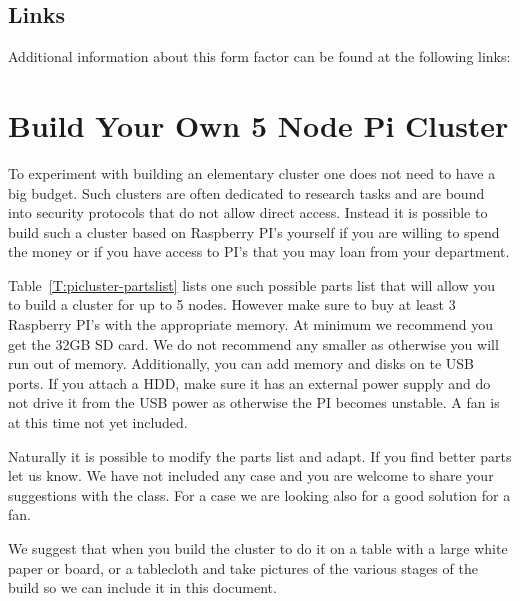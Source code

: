 \subsection{Links}\label{links}

Additional information about this form factor can be found at the
following links:




\section{Build Your Own 5 Node Pi Cluster}\label{s:pi5}

To experiment with building an elementary cluster one does not need to
have a big budget. Such clusters are often dedicated to research tasks
and are bound into security protocols that do not allow direct
access. Instead it is possible to build such a cluster based on
Raspberry PI's yourself if you are willing to spend the money or if
you have access to PI's that you may loan from your department.

Table~\ref{T:picluster-partslist} lists one such possible parts list
that will allow you to build a cluster for up to 5 nodes. However make
sure to buy at least 3 Raspberry PI's with the appropriate memory. At
minimum we recommend you get the 32GB SD card. We do not recommend any
smaller as otherwise you will run out of memory. Additionally, you can
add memory and disks on te USB ports. If you attach a HDD, make sure
it has an external power supply and do not drive it from the USB power
as otherwise the PI becomes unstable.  A fan is at this time not yet
included.

Naturally it is possible to modify the parts list and adapt. If you
find better parts let us know. We have not included any case and you
are welcome to share your suggestions with the class. For a case we
are looking also for a good solution for a fan.

We suggest that when you build the cluster to do it on a table with a
large white paper or board, or a tablecloth and take pictures of the
various stages of the build so we can include it in this document.

